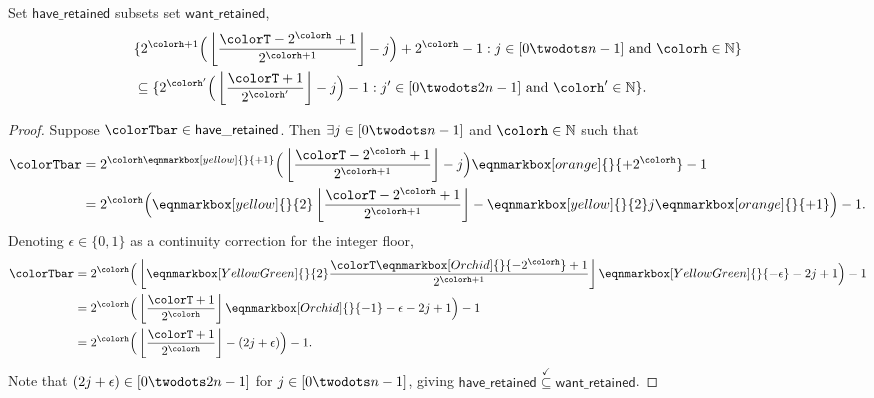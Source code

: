 \begin{sublemma}
\label{thm:tilted-rsubset}
Set $\mathsf{have\_retained}$ subsets set $\mathsf{want\_retained}$,
\begin{align*}
&\{
  2^{\colorh + 1}\Big( \left\lfloor\frac{\colorT - 2^{\colorh} + 1}{2^{\colorh + 1}} \right\rfloor - j\Big) + 2^{\colorh} - 1
  :
  j \in [0 \twodots n-1]
  \text{ and }
  \colorh \in \mathbb{N}
\}\\
&\subseteq
\{
  2^{\colorh'}\Big(\left\lfloor \frac{\colorT + 1}{2^{\colorh'}} \right\rfloor - j\Big) - 1
  :
  j' \in [0 \twodots 2n-1]
  \text{ and }
  \colorh' \in \mathbb{N}
\}.
\end{align*}
\end{sublemma}
\begin{proof}
Suppose $\colorTbar \in \mathsf{have\_retained}$.
Then $\exists j \in [0 \twodots n-1]$ and $\colorh \in \mathbb{N}$ such that
\begin{align*}
\colorTbar
&= 2^{\colorh \eqnmarkbox[yellow]{}{+ 1}}\Big(\left\lfloor \frac{\colorT - 2^{\colorh} + 1}{2^{\colorh + 1}} \right\rfloor - j \Big) \eqnmarkbox[orange]{}{+ 2^{\colorh}} - 1\\
&= 2^{\colorh} \Big(\eqnmarkbox[yellow]{}{2}\left\lfloor \frac{\colorT - 2^{\colorh} + 1}{2^{\colorh + 1}} \right\rfloor  - \eqnmarkbox[yellow]{}{2}j \eqnmarkbox[orange]{}{+ 1} \Big) - 1.
\end{align*}
Denoting $\epsilon \in \{0, 1\}$ as a continuity correction for the integer floor,
\begin{align*}
\colorTbar
&= 2^{\colorh} \Big( \left\lfloor \eqnmarkbox[YellowGreen]{}{2} \frac{\colorT \eqnmarkbox[Orchid]{}{- 2^{\colorh}} + 1}{2^{\colorh+1}} \right\rfloor \eqnmarkbox[YellowGreen]{}{- \epsilon}  - 2j + 1 \Big) - 1\\
&= 2^{\colorh} \Big( \left\lfloor \frac{\colorT + 1}{2^{\colorh}} \right\rfloor \eqnmarkbox[Orchid]{}{- 1} - \epsilon - 2j + 1 \Big) - 1\\
&= 2^{\colorh} \Big(\left\lfloor \frac{\colorT + 1}{2^{\colorh}}\right\rfloor - (2j + \epsilon) \Big) - 1.
\end{align*}
Note that $(2j + \epsilon) \in [0 \twodots 2n-1]$ for $j \in [0 \twodots n-1]$, giving $\mathsf{have\_retained} \stackrel{\checkmark}{\subseteq} \mathsf{want\_retained}$.
\end{proof}

